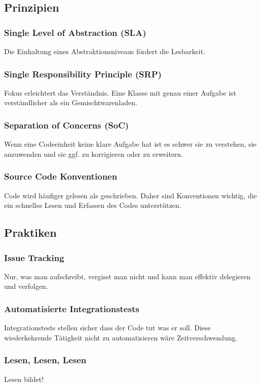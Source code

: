 \documentclass[a5paper, landscape]{article}
\begin{document}
	\newpage
	\begin{minipage}[t]{.5\textwidth}
		\subsection*{Prinzipien}
		\subsubsection*{Single Level of Abstraction (SLA)}
		Die Einhaltung eines Abstraktionsniveaus fördert die Lesbarkeit.
		\subsubsection*{Single Responsibility Principle (SRP)}
		Fokus erleichtert das Verständnis. Eine Klasse mit genau einer Aufgabe ist verständlicher als ein Gemischtwarenladen.
		\subsubsection*{Separation of Concerns (SoC)}
		Wenn eine Codeeinheit keine klare Aufgabe hat ist es schwer sie zu verstehen, sie anzuwenden und sie ggf. zu korrigieren oder zu erweitern.
		\subsubsection*{Source Code Konventionen}
		Code wird häufiger gelesen als geschrieben. Daher sind Konventionen wichtig, die ein schnelles Lesen und Erfassen des Codes unterstützen.
	\end{minipage}
	\hspace{0.5cm}
	\begin{minipage}[t]{.5\textwidth}
		\subsection*{Praktiken}
		\subsubsection*{Issue Tracking}
		Nur, was man aufschreibt, vergisst man nicht und kann man effektiv delegieren und verfolgen.
		\subsubsection*{Automatisierte Integrationstests}
		Integrationstests stellen sicher dass der Code tut was er soll. Diese wiederkehrende Tätigkeit nicht zu automatisieren wäre Zeitverschwendung.
		\subsubsection*{Lesen, Lesen, Lesen}
		Lesen bildet!
	\end{minipage}
	
\end{document}

